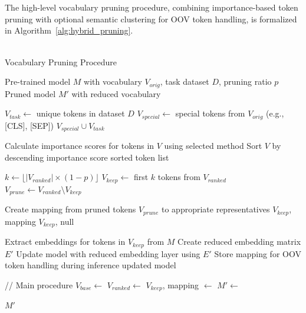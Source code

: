 \documentclass[twocolumn]{article}
\begin{document}
\\ \\
The high-level vocabulary pruning procedure, combining importance-based token pruning with optional semantic clustering for OOV token handling, is formalized in Algorithm~\ref{alg:hybrid_pruning}.
\\ \\
\begin{algorithm}[H]
\caption{Vocabulary Pruning Procedure}
\label{alg:hybrid_pruning}
\begin{algorithmic}[1]
\footnotesize
\Require Pre-trained model $M$ with vocabulary $V_{orig}$, task dataset $D$, pruning ratio $p$
\Ensure Pruned model $M'$ with reduced vocabulary

    \State $V_{task} \gets $ unique tokens in dataset $D$
    \State $V_{special} \gets $ special tokens from $V_{orig}$ (e.g., [CLS], [SEP])
    \State \Return $V_{special} \cup V_{task}$ 
\EndFunction

    \State Calculate importance scores for tokens in $V$ using selected method
    \State Sort $V$ by descending importance score
    \State \Return sorted token list
\EndFunction

    \State $k \gets \lfloor |V_{ranked}| \times (1 - p) \rfloor$ 
    \State $V_{keep} \gets $ first $k$ tokens from $V_{ranked}$
    \State $V_{prune} \gets V_{ranked} \setminus V_{keep}$ 
    
        \State Create mapping from pruned tokens $V_{prune}$ to appropriate representatives
        \State \Return $V_{keep}$, mapping
    \Else
        \State \Return $V_{keep}$, null
    \EndIf
\EndFunction

    \State Extract embeddings for tokens in $V_{keep}$ from $M$
    \State Create reduced embedding matrix $E'$
    \State Update model with reduced embedding layer using $E'$
        \State Store mapping for OOV token handling during inference
    \EndIf
    \State \Return updated model
\EndFunction

\State // Main procedure
\State $V_{base} \gets $ 
\State $V_{ranked} \gets $ 
\State $V_{keep}$, mapping $\gets $ 
\State $M' \gets $ 

\State \Return $M'$ 
\end{algorithmic}
\end{algorithm}
\end{document}
